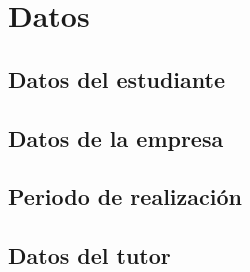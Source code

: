\chapter{Datos}
\label{sec:datos}

\section{Datos del estudiante}
\label{subsec:estrudiante-data}

\section{Datos de la empresa}
\label{subsec:company-data}

\section{Periodo de realización}
\label{subsec:period-data}

\section{Datos del tutor}
\label{subsec:tutor-data}
